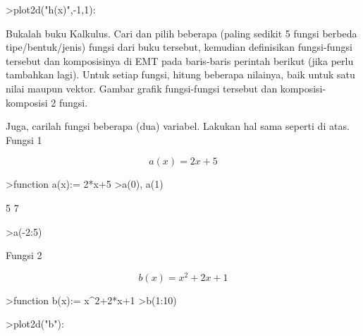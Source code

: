 \documentclass[12pt,arial,letterpaper]{book}
\begin{document}
\begin{eulercomment}
\begin{eulercomment}
\begin{eulercomment}
\begin{eulercomment}
\begin{eulercomment}
\begin{eulercomment}
\begin{eulercomment}
\begin{eulercomment}
\begin{eulercomment}
\begin{eulercomment}
\begin{eulercomment}
\begin{eulercomment}
\begin{eulercomment}
\begin{eulercomment}
\begin{eulercomment}
\begin{eulercomment}
\begin{eulercomment}
\begin{eulercomment}
\begin{euleroutput}
\end{euleroutput}
\begin{eulerprompt}
>plot2d("h(x)",-1,1):
\end{eulerprompt}
\begin{eulercomment}
Bukalah buku Kalkulus. Cari dan pilih beberapa (paling sedikit 5
fungsi berbeda tipe/bentuk/jenis) fungsi dari buku tersebut, kemudian
definisikan fungsi-fungsi tersebut dan komposisinya di EMT pada
baris-baris perintah berikut (jika perlu tambahkan lagi). Untuk setiap
fungsi, hitung beberapa nilainya, baik untuk satu nilai maupun vektor.
Gambar grafik fungsi-fungsi tersebut dan komposisi-komposisi 2 fungsi.

Juga, carilah fungsi beberapa (dua) variabel. Lakukan hal sama seperti
di atas.\\
Fungsi 1\\
\end{eulercomment}
\begin{eulerformula}
\[
a(x)=2x+5
\]
\end{eulerformula}
\begin{eulerprompt}
>function a(x):= 2*x+5
>a(0), a(1)
\end{eulerprompt}
\begin{euleroutput}
  5
  7
\end{euleroutput}
\begin{eulerprompt}
>a(-2:5)
\end{eulerprompt}
\begin{euleroutput}
  [1,  3,  5,  7,  9,  11,  13,  15]
\end{euleroutput}
\begin{eulercomment}
Fungsi 2\\
\end{eulercomment}
\begin{eulerformula}
\[
b(x)=x^2+2x+1
\]
\end{eulerformula}
\begin{eulerprompt}
>function b(x):= x^2+2*x+1
>b(1:10)
\end{eulerprompt}
\begin{euleroutput}
  [4,  9,  16,  25,  36,  49,  64,  81,  100,  121]
\end{euleroutput}
\begin{eulerprompt}
>plot2d("b"):
\end{eulerprompt}

\end{eulercomment}
\end{eulercomment}
\end{eulercomment}
\end{eulercomment}
\end{eulercomment}
\end{eulercomment}
\end{eulercomment}
\end{eulercomment}
\end{eulercomment}
\end{eulercomment}
\end{eulercomment}
\end{eulercomment}
\end{eulercomment}
\end{eulercomment}
\end{eulercomment}
\end{eulercomment}
\end{eulercomment}
\end{eulercomment}
\end{document}
